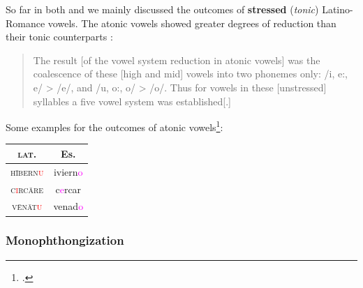 \documentclass{report}[12pt]
\begin{document}
So far in both  and  we mainly discussed the outcomes of \textbf{stressed} (\emph{tonic}) Latino-Romance vowels. The atonic vowels showed greater degrees of reduction than their tonic counterparts \parencite[p.~113]{lloyd_spanish}:
\begin{quote}
  The result [of the vowel system reduction in atonic vowels] was the coalescence of these [high and mid] vowels into two phonemes only: /i, e:, e/ > /e/, and /u, o:, o/ > /o/. Thus for vowels in these [unstressed] syllables a five vowel system was established[.] 
\end{quote}
Some examples for the outcomes of atonic vowels\footcite[p.~113]{lloyd_spanish}:
\begin{center}
  \begin{tabular}{c c}
    \textsc{lat.} & Es. \\
    \hline
    \textsc{h\={i}bern\textcolor{red}{u}} & iviern\textcolor{magenta}{o} \\
    \textsc{c\textcolor{red}{i}rc\={a}re} & c\textcolor{magenta}{e}rcar \\
    \textsc{v\={e}n\={a}t\textcolor{red}{u}} & venad\textcolor{magenta}{o} \\
  \end{tabular}
\end{center}

\subsubsection{Monophthongization}\label{sec:monophthongization}
\end{document}
